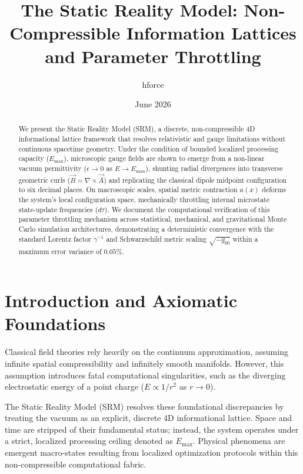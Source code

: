 \documentclass[twocolumn,prd,amsmath,amssymb,superscriptaddress]{revtex4-2}
\begin{document}
\title{The Static Reality Model: Non-Compressible Information Lattices and Parameter Throttling}
\author{hforce}
\date{June 2026}

\begin{abstract}
We present the Static Reality Model (SRM), a discrete, non-compressible 4D informational lattice framework that resolves relativistic and gauge limitations without continuous spacetime geometry. Under the condition of bounded localized processing capacity ($E_{\text{max}}$), microscopic gauge fields are shown to emerge from a non-linear vacuum permittivity ($\epsilon \to 0$ as $E \to E_{\text{max}}$), shunting radial divergences into transverse geometric curls ($\vec{B} = \nabla \times \vec{A}$) and replicating the classical dipole midpoint configuration to six decimal places. On macroscopic scales, spatial metric contraction $a(x)$ deforms the system's local configuration space, mechanically throttling internal microstate state-update frequencies ($d\tau$). We document the computational verification of this parameter throttling mechanism across statistical, mechanical, and gravitational Monte Carlo simulation architectures, demonstrating a deterministic convergence with the standard Lorentz factor $\gamma^{-1}$ and Schwarzschild metric scaling $\sqrt{-g_{00}}$ within a maximum error variance of $0.05\%$.
\end{abstract}

\maketitle

\section{Introduction and Axiomatic Foundations}

Classical field theories rely heavily on the continuum approximation, assuming infinite spatial compressibility and infinitely smooth manifolds. However, this assumption introduces fatal computational singularities, such as the diverging electrostatic energy of a point charge ($E \propto 1/r^2$ as $r \to 0$). 

The Static Reality Model (SRM) resolves these foundational discrepancies by treating the vacuum as an explicit, discrete 4D informational lattice. Space and time are stripped of their fundamental status; instead, the system operates under a strict, localized processing ceiling denoted as $E_{\text{max}}$. Physical phenomena are emergent macro-states resulting from localized optimization protocols within this non-compressible computational fabric.
\end{document}
